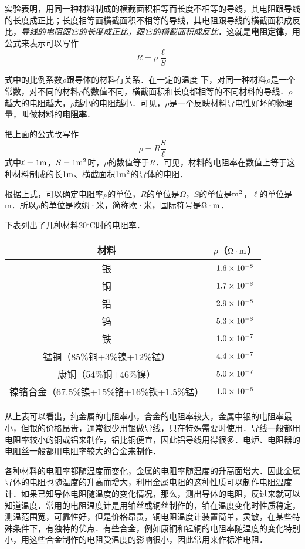 实验表明，用同一种材料制成的横截面积相等而长度不相等的导线，其电阻跟导线的长度成正比；长度相等面横截面积不相等的导线，其电阻跟导线的横截面积成反比，\textit{导线的电阻跟它的长度成正比，跟它的横截面积成反比}．这就是\textbf{电阻定律}，用公式来表示可以写作
\[R=\rho\frac{\ell}{S}\]

式中的比例系数$\rho$跟导体的材料有关系．在一定的温度
下，对同一种材料$\rho$是一个常数，对不同的材料$\rho$的数值不同，横截面积和长度都相等的不同材料的导线．$\rho$越大的电阻越大，$\rho$越小的电阻越小．可见，$\rho$是一个反映材料导电性好坏的物理量，叫做材料的\textbf{电阻率}．

把上面的公式改写作
\[\rho=R\frac{S}{\ell}\]
式中$\ell=1{\rm m}$，$S=1{\rm m^2}$时，$\rho$的数值等于$R$．可见，材料的电阻率在数值上等于这种材料制成的长1${\rm m}$、横截面积1${\rm m}^2$的导体的电阻．

根据上式，可以确定电阻率$\rho$的单位，$R$的单位是$\Omega$，$S$的单位是${\rm m^2}$，$\ell$的单位是m．所以$\rho$的单位是欧姆·米，简称欧·米，国际符号是$\Omega\cdot {\rm m}$．

下表列出了几种材料20$^\circ$C时的电阻率．

\begin{center}
    \begin{tabular}{cc}
\hline
        材料  & $\rho$（$\Omega\cdot {\rm m}$）\\
    \hline
银   & $ 1.6\times 10^{-8}$   \\
铜  & $ 1.7\times 10^{-8}$   \\
铝  & $ 2.9\times 10^{-8}$   \\
钨  & $ 5.3\times 10^{-8}$   \\
铁  & $ 1.0\times 10^{-7}$   \\
锰铜（85\%铜+3\%镍+12\%锰）  & $ 4.4\times 10^{-7}$   \\
康铜（54\%铜+46\%镍） & $ 5.0\times 10^{-7}$   \\
镍铬合金（67.5\%镍+15\%铬+16\%铁+1.5\%锰） & $1.0 \times 10^{-6}$   \\
    \hline
    \end{tabular}
\end{center}

从上表可以看出，纯金属的电阻率小，合金的电阻率较大，金属中银的电阻率最小，但银的价格昂贵，通常很少用银做导线，只在特殊需要时使用．导线一般都用电阻率较小的铜或铝来制作，铝比铜便宜，因此铝导线用得很多．电炉、电阻器的电阻丝一般都用电阻率较大的合金来制作．

各种材料的电阻率都随温度而变化，金属的电阻率随温度的升高面增大．因此金属导体的电阻也随温度的升高而增大，利用金属电阻的这种性质可以制作电阻温度计．如果已知导体电阻随温度的变化情况，那么，测出导体的电阻，反过来就可以知道温度．常用的电阻温度计是用铂丝或铜丝制作的，铂在温度变化时性质稳定，测温范围宽，可靠性好，但是价格昂贵，铜电阻温度计装置简单，灵敏，在某些特殊条件下，有独特的优点．有些合金，例如康铜和锰铜的电阻率随温度的变化特别小，用这些合金制作的电阻受温度的影响很小，因此常用来作标准电阻．


